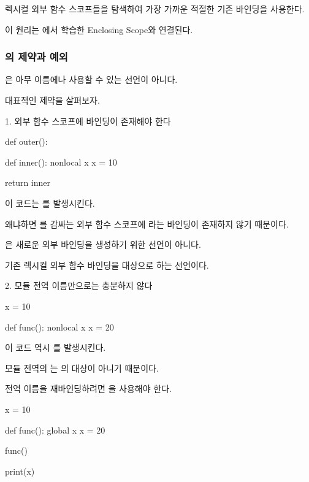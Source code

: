 렉시컬 외부 함수 스코프들을 탐색하여 가장 가까운 적절한 기존 바인딩을 사용한다.

이 원리는 에서 학습한 Enclosing Scope와 연결된다.

\subsubsection{의 제약과 예외}

은 아무 이름에나 사용할 수 있는 선언이 아니다.

대표적인 제약을 살펴보자.

\begin{dhknote}
\begin{dhksmry}[centered]
1. 외부 함수 스코프에 바인딩이 존재해야 한다
\end{dhksmry}
\end{dhknote}

\begin{dhkcode}
def outer():

    def inner():
        nonlocal x
        x = 10

    return inner
\end{dhkcode}

이 코드는 를 발생시킨다.

왜냐하면 를 감싸는 외부 함수 스코프에 라는 바인딩이 존재하지 않기 때문이다.

은 새로운 외부 바인딩을 생성하기 위한 선언이 아니다.

기존 렉시컬 외부 함수 바인딩을 대상으로 하는 선언이다.

\begin{dhknote}
\begin{dhksmry}[centered]
2. 모듈 전역 이름만으로는 충분하지 않다
\end{dhksmry}
\end{dhknote}

\begin{dhkcode}
x = 10

def func():
    nonlocal x
    x = 20
\end{dhkcode}

이 코드 역시 를 발생시킨다.

모듈 전역의 는 의 대상이 아니기 때문이다.

전역 이름을 재바인딩하려면 을 사용해야 한다.

\begin{dhkcode}
x = 10

def func():
    global x
    x = 20


func()

print(x)
\end{dhkcode}

